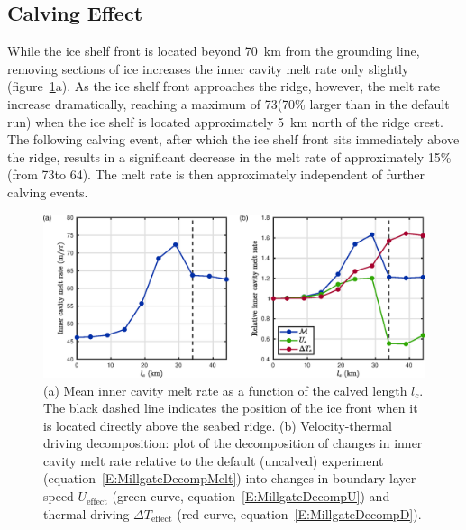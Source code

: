 \documentclass[draft]{agujournal2019}
\begin{document}
\subsection{Calving Effect}
While the ice shelf front is located beyond 70~km from the grounding line, removing sections of ice increases the inner cavity melt rate only slightly (figure~\ref{fig:figure4}a). As the ice shelf front approaches the ridge, however, the melt rate increase dramatically, reaching a maximum of 73\mpryr (70\% larger than in the default run) when the ice shelf is located approximately 5~km north of the ridge crest. The following calving event, after which the ice shelf front sits immediately above the ridge, results in a significant decrease in the melt rate of approximately 15\%  (from 73\mpryr to 64\mpryr). The melt rate is then approximately independent of further calving events.


\begin{figure}
    \centering
    \includegraphics[width = \textwidth]{../make_figures/plots/figure4.eps}
    \caption{(a) Mean inner cavity melt rate as a function of the calved length $l_c$. The black dashed line indicates the position of the ice front when it is located directly above the seabed ridge. (b) Velocity-thermal driving decomposition: plot of the decomposition of changes in inner cavity melt rate relative to the default (uncalved) experiment (equation~\eqref{E:MillgateDecompMelt}) into changes in boundary layer speed $U_\text{effect}$ (green curve, equation~\eqref{E:MillgateDecompU}) and thermal driving $\Delta T_{\text{effect}}$ (red curve, equation~\eqref{E:MillgateDecompD}).}
    \label{fig:figure4}
\end{figure}
\end{document}
